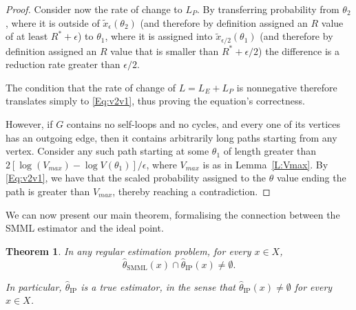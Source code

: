 \documentclass{IEEEtran}
\newtheorem{thm}{Theorem}
\begin{document}
\begin{proof}
Consider now the rate of change to $L_P$.
By transferring probability from $\theta_2$,
where it is outside of $\tilde{x}_{\epsilon}(\theta_2)$ (and therefore by definition
assigned an $R$ value of at least $R^*+\epsilon$) to $\theta_1$,
where it is assigned into $\tilde{x}_{\epsilon/2}(\theta_1)$ (and therefore by
definition assigned an $R$ value that is smaller than $R^*+\epsilon/2$)
the difference is a reduction rate greater than $\epsilon/2$.

The condition that the rate of change of $L=L_E+L_P$ is nonnegative
therefore translates simply to \eqref{Eq:v2v1}, thus proving the equation's
correctness.

However, if $G$ contains no self-loops and no cycles, and every one of its
vertices has an outgoing edge, then it contains arbitrarily long paths
starting from any vertex.
Consider any such path starting at some $\theta_1$ of length greater than 
$2[\log(V_{\textit{max}})-\log V(\theta_1)]/\epsilon$,
where $V_{\textit{max}}$ is as in Lemma~\ref{L:Vmax}.
By \eqref{Eq:v2v1}, we have that the scaled probability
assigned to the $\theta$ value ending the path is greater than
$V_{\textit{max}}$, thereby reaching a contradiction.
\end{proof}

We can now present our main theorem, formalising the connection between the
SMML estimator and the ideal point.

\begin{thm}\label{T:SMML_IP}
In any regular estimation problem, for every $x\in X$,
\begin{equation}\label{Eq:SMML_IP}
\hat{\theta}_{\text{SMML}}(x) \cap \hat{\theta}_{\text{IP}}(x) \ne \emptyset.
\end{equation}

In particular, $\hat{\theta}_{\text{IP}}$ is a true estimator, in the sense
that $\hat{\theta}_{\text{IP}}(x) \ne \emptyset$ for every $x\in X$.
\end{thm}

\end{document}
